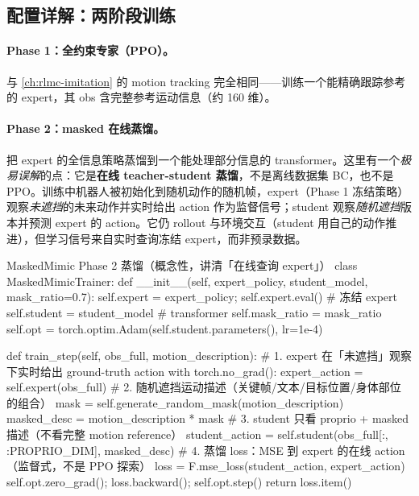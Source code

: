 \subsection{配置详解：两阶段训练}
\label{sec:rlmc-mm-masked-train}

\paragraph{Phase 1：全约束专家（PPO）。}与 \cref{ch:rlmc-imitation} 的 motion tracking 完全相同——训练一个能精确跟踪参考的 expert，其 obs 含完整参考运动信息（约 160 维）。

\paragraph{Phase 2：masked 在线蒸馏。}把 expert 的全信息策略蒸馏到一个能处理部分信息的 transformer。这里有一个\emph{极易误解}的点：它是\textbf{在线 teacher-student 蒸馏}，不是离线数据集 BC，也不是 PPO。训练中机器人被初始化到随机动作的随机帧，expert（Phase 1 冻结策略）观察\emph{未遮挡}的未来动作并实时给出 action 作为监督信号；student 观察\emph{随机遮挡}版本并预测 expert 的 action。它仍 rollout 与环境交互（student 用自己的动作推进），但学习信号来自实时查询冻结 expert，而非预录数据。

\begin{codebox}[Python]{MaskedMimic Phase 2 蒸馏（概念性，讲清「在线查询 expert」）}
class MaskedMimicTrainer:
    def __init__(self, expert_policy, student_model, mask_ratio=0.7):
        self.expert = expert_policy; self.expert.eval()   # 冻结 expert
        self.student = student_model                      # transformer
        self.mask_ratio = mask_ratio
        self.opt = torch.optim.Adam(self.student.parameters(), lr=1e-4)

    def train_step(self, obs_full, motion_description):
        # 1. expert 在「未遮挡」观察下实时给出 ground-truth action
        with torch.no_grad():
            expert_action = self.expert(obs_full)
        # 2. 随机遮挡运动描述（关键帧/文本/目标位置/身体部位 的组合）
        mask = self.generate_random_mask(motion_description)
        masked_desc = motion_description * mask
        # 3. student 只看 proprio + masked 描述（不看完整 motion reference）
        student_action = self.student(obs_full[:, :PROPRIO_DIM], masked_desc)
        # 4. 蒸馏 loss：MSE 到 expert 的在线 action（监督式，不是 PPO 探索）
        loss = F.mse_loss(student_action, expert_action)
        self.opt.zero_grad(); loss.backward(); self.opt.step()
        return loss.item()
\end{codebox}


